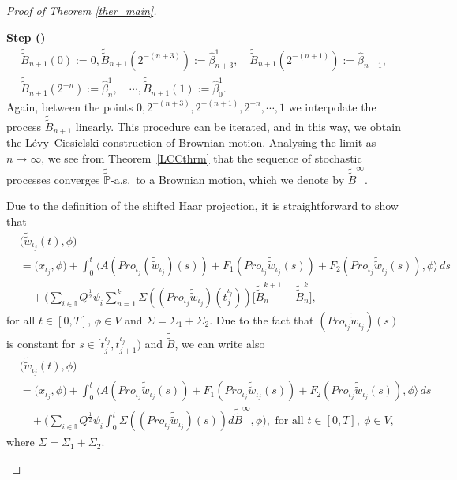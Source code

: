 \documentclass[english,a4paper,11pt]{amsart}
\theoremstyle{plain}
\theoremstyle{definition}
\theoremstyle{remark}
\numberwithin{equation}{section}
\newcounter{lil1}
\newenvironment{step}
{\begin{list} { \bf Step (\Roman{lil1})}
		{ \usecounter{lil1}
			\setlength{\leftmargin}{0.0cm}
			\setlength{\topsep}{0.2cm}
			\setlength{\itemsep}{0.0cm}
			\setlength{\parsep}{0.1cm}
			\setlength{\itemindent}{0.8cm}
			\setlength{\parskip}{0.0cm}}}
	{\end{list}}
\newcounter{lil33}
\newcounter{lil1q}
\newcommand{\wi}[1]{{\widetilde{#1}}}
\def\wi{\widetilde}
\newcommand{\la}{\langle}
\newcommand{\ra}{\rangle}
\newcommand{\Pro}{Pro}
\begin{document}
\begin{proof}[Proof of Theorem \ref{ther_main}]
\begin{step}
	 \begin{align*}
	 	&\widetilde{\widetilde{B}}_{n+1}(0):=	0, \widetilde{\widetilde{B}}_{n+1}(2^{-(n+3)}):=\widehat{\beta}^1_{n+3},\quad 
	 	\widetilde{\widetilde{B}}_{n+1}( 2^{-(n+1)} ):=\widehat{\beta}_{n+1},\quad \\
	 	&\widetilde{\widetilde{B}}_{n+1}(2^{-n}):=\widehat{\beta}^1_{n},\quad \cdots,  \widetilde{\widetilde{B}}_{n+1}(1):=\widehat{\beta}_0^1.
	 \end{align*}
	 Again, between the points $0,2^{-(n+3 )},2^{-(n+1)},2^{-n},\cdots, 1$  we  interpolate the process $\widetilde{\widetilde{B}}_{n+1}$  linearly. 
	 This procedure can be iterated, and in this way, we obtain the
L\'evy–Ciesielski construction of Brownian motion.
Analysing the limit as \(n\to\infty\), we see from Theorem~\ref{LCCthrm}
that the sequence of stochastic processes converges 
\(\wi{\widetilde{\mathbb{P}}}\)-a.s.\ to a Brownian motion, which we denote by 
\(\wi{\widetilde{B}}^{\infty}\).
	 
	
%
	
	Due to the definition of the shifted Haar projection, 
	it is straightforward to show that 
	\begin{align*} \nonumber 
		&\big( \widetilde{\widetilde{w}}_{{\iota_j}}(t),\phi\big)
		\\&\nonumber =\big( x_{{\iota_j}},\phi\big)+\int_{0}^{t}\big\la 
	A( \Pro_{{\iota_j}}(\widetilde{\widetilde{w}}_{{\iota_j}})(s) )+F_1(\Pro_{\iota_j}\widetilde{\widetilde{w}}_{\iota_j}(s))+F_2(\Pro_{\iota_j}\widetilde{\widetilde{w}}_{\iota_j}(s))
	,\phi\big\ra \, d s
		\\	& \quad +\Big(\sum_{i\in \mathbb{I}}Q^{\frac{1}{2}}{\psi_i} \sum_{n=1}^k \Sigma((\Pro_{{\iota_j}}	\widetilde{\widetilde{w}}_{{\iota_j}})(t_j^{{\iota_j}}) ) \big[\wi{\wi{B}}_{n}^{k+1}-\wi{\wi{B}}_{n}^{k}\big] ,  	\end{align*}
	for all $ t\in [0,T],\,\phi\in V$ and $\Sigma=\Sigma_1+\Sigma_2$. 
Due to the fact that 	$(\Pro_{{\iota_j}}	\widetilde{\widetilde{w}}_{{\iota_j}})(s)$ is constant for $s\in [t_j^{\iota_j}, t_{j+1}^{\iota_j})$ and  $\widetilde{\widetilde{B}}$, we can write also 
	\begin{align} \nonumber 
		&\big( \widetilde{\widetilde{w}}_{{\iota_j}}(t),\phi \big)
	\\&\nonumber =\big( x_{{\iota_j}}, \phi \big)+\int_{0}^{t}\big\la 
	A( \Pro_{{\iota_j}}\widetilde{\widetilde{w}}_{{\iota_j}}(s) )+F_1(\Pro_{\iota_j}\widetilde{\widetilde{w}}_{\iota_j}(s))+F_2(\Pro_{\iota_j}\widetilde{\widetilde{w}}_{\iota_j}(s)), \phi \big\ra 
	\,ds
	\\	&\quad  +\Big(\sum_{i\in \mathbb{I}}Q^{\frac{1}{2}}{\psi_i}  \int_0^t \Sigma((\Pro_{{\iota_j}}\widetilde{\widetilde{w}}_{{\iota_j}})(s) ) d\wi{\widetilde B}^\infty ,\phi\Big) ,  \text{ for all }t\in[0,T], \ \phi\in V, \label{a_infty}
\end{align}where $\Sigma=\Sigma_1+\Sigma_2$.
	


\end{step}
\end{proof}
\end{document}
